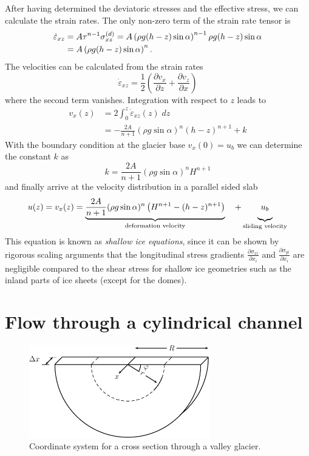 \documentclass[11pt,a4paper,halfparskip]{scrartcl}
\newcommand{\epsdot}{\dot{\varepsilon}}
\begin{document}
After having determined the deviatoric stresses and the effective stress, we
can calculate the strain rates.  The only non-zero term of the strain rate
tensor is 
%
\begin{align}
  \epsdot_{xz} &= A \tau^{n-1}\sigma^{(d)}_{xz}
  = A \left( \rho g (h-z) \sin\alpha \right)^{n-1}\rho g (h-z) \sin\alpha
  \notag\\
  &= A\left( \rho g (h-z) \sin\alpha \right)^{n}.
\end{align}
\newpage
The velocities can be calculated from the strain rates
%
\begin{equation*}
  \epsdot_{xz} = \frac{1}{2}\left( \frac{\partial v_x}{\partial z} + \frac{\partial v_z}{\partial x} \right)
\end{equation*}
%
where the second term vanishes.  Integration with respect to $z$ leads to
%
\begin{align*}
  v_x(z) &= 2 \int_0^z \epsdot_{xz}(z)\; dz\\
         &= - \frac{2A}{n+1} (\rho g \sin\alpha)^n (h-z)^{n+1} + k
\end{align*}
%
With the boundary condition at the glacier base $v_x(0)=u_b$ we can determine
the constant $k$ as
%
\begin{equation*}
  k = \frac{2A}{n+1} (\rho g \sin\alpha)^n H^{n+1}
\end{equation*}
%
and finally arrive at the velocity distribution in a parallel sided slab
%
\begin{equation}
  \label{eq:parallel-slab-velocity}
 u(z) = v_x(z) = \underbrace{\frac{2A}{n+1} (\rho g \sin\alpha)^n \left( H^{n+1}-(h-z)^{n+1}
  \right)}_{\text{deformation velocity}}\quad + \underbrace{u_b\rule[-1.9ex]{0ex}{1ex}}_{\text{sliding velocity}}
\end{equation}
%
This equation is known as \emph{shallow ice equations}, since it
can be shown by rigorous scaling arguments that the longitudinal stress
gradients $\frac{\partial \sigma_{xi}}{\partial x_{i}}$ and $\frac{\partial
  \sigma_{yi}}{\partial x_i}$ are negligible compared to the shear stress for
shallow ice geometries such as the inland parts of ice sheets (except for the
domes).


\section{Flow through a cylindrical channel}
\label{sec:flow-through-cylindrical-channel}

\begin{figure}[bhtp]
  \centering
  \includegraphics[width=0.7\textwidth]{figures/fig_channel}
  \caption{Coordinate system for a cross section through a valley glacier.  }
  \label{fig:valley-glacier-coord}
\end{figure}
\end{document}
